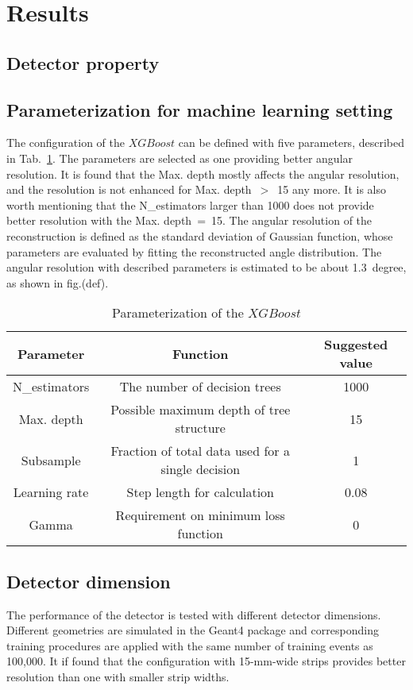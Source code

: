 \documentclass[jkps,preprint,fleqn,showpacs,showkeys]{revtex4}
\newcommand{\XGB}{XGBoost}
\begin{document}
\section{Results}
\label{sec:res}

\subsection{Detector property}

\subsection{Parameterization for machine learning setting}
The configuration of the $\XGB$ can be defined with five parameters, described in Tab.~\ref{tab:XgbPar}. The parameters are selected as one providing better angular resolution. It is found that the Max. depth mostly affects the angular resolution, and the resolution is not enhanced for Max. depth~$>$~15 any more. It is also worth mentioning that the N\_estimators larger than 1000 does not provide better resolution with the Max. depth~=~15. The angular resolution of the reconstruction is defined as the standard deviation of Gaussian function, whose parameters are evaluated by fitting the reconstructed angle distribution. The angular resolution with described parameters is estimated to be about 1.3~degree, as shown in fig.(def).

\begin{table}[hbt!]
\centering
\caption{Parameterization of the $\XGB$}
\begin{tabular}{ccc}
\hline 
Parameter & Function & Suggested value \\ \hline 
N\_estimators & The number of decision trees & 1000 \\  
Max. depth & Possible maximum depth of tree structure & 15 \\ 
Subsample & Fraction of total data used for a single decision & 1 \\ 
Learning rate & Step length for calculation & 0.08 \\ 
Gamma & Requirement on minimum loss function & 0 \\ 
\hline
\end{tabular}
\label{tab:XgbPar}
\end{table}

\subsection{Detector dimension}
The performance of the detector is tested with different detector dimensions. Different geometries are simulated in the Geant4 package and corresponding training procedures are applied with the same number of training events as 100,000. It if found that the configuration with 15-mm-wide strips provides better resolution than one with smaller strip widths. 
\end{document}
